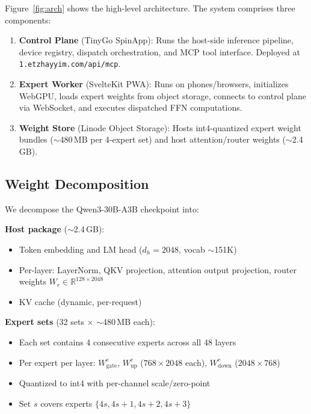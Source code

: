 \documentclass[11pt,a4paper]{article}
\begin{document}
Figure~\ref{fig:arch} shows the high-level architecture. The system
comprises three components:

\begin{enumerate}
  \item \textbf{Control Plane} (TinyGo SpinApp): Runs the
    host-side inference pipeline, device registry, dispatch
    orchestration, and MCP tool interface. Deployed at
    \texttt{1.etzhayyim.com/api/mcp}.

  \item \textbf{Expert Worker} (SvelteKit PWA): Runs on phones/browsers,
    initializes WebGPU, loads expert weights from object storage,
    connects to control plane via WebSocket, and executes dispatched
    FFN computations.

  \item \textbf{Weight Store} (Linode Object Storage): Hosts int4-quantized
    expert weight bundles ($\sim$480\,MB per 4-expert set) and host
    attention/router weights ($\sim$2.4\,GB).
\end{enumerate}

\subsection{Weight Decomposition}
\label{sec:decomp}

We decompose the Qwen3-30B-A3B checkpoint into:

\textbf{Host package} ($\sim$2.4\,GB):
\begin{itemize}
  \item Token embedding and LM head ($d_h = 2048$, vocab $\sim$151K)
  \item Per-layer: LayerNorm, QKV projection, attention output
    projection, router weights $W_r \in \mathbb{R}^{128 \times 2048}$
  \item KV cache (dynamic, per-request)
\end{itemize}

\textbf{Expert sets} (32 sets $\times$ $\sim$480\,MB each):
\begin{itemize}
  \item Each set contains 4 consecutive experts across all 48 layers
  \item Per expert per layer: $W_{\text{gate}}^e$, $W_{\text{up}}^e$
    ($768 \times 2048$ each), $W_{\text{down}}^e$ ($2048 \times 768$)
  \item Quantized to int4 with per-channel scale/zero-point
  \item Set $s$ covers experts $\{4s, 4s{+}1, 4s{+}2, 4s{+}3\}$
\end{itemize}
\end{document}
